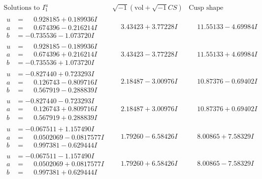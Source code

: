 \documentclass[1p]{elsarticle_modified}
\theoremstyle{definition}
\newcommand{\I}{\sqrt{-1}}
\begin{document}
$$\begin{array}{c|c|c}  
\text{Solutions to }I^u_{1}& \I (\text{vol} + \sqrt{-1}CS) & \text{Cusp shape}\\
 \hline 
\begin{aligned}
u &= \phantom{-}0.928185 + 0.189936 I \\
a &= \phantom{-}0.674396 - 0.216214 I \\
b &= -0.735536 - 1.073720 I\end{aligned}
 & \phantom{-}3.43423 + 3.77228 I & \phantom{-}11.55133 - 4.69984 I \\ \hline\begin{aligned}
u &= \phantom{-}0.928185 - 0.189936 I \\
a &= \phantom{-}0.674396 + 0.216214 I \\
b &= -0.735536 + 1.073720 I\end{aligned}
 & \phantom{-}3.43423 - 3.77228 I & \phantom{-}11.55133 + 4.69984 I \\ \hline\begin{aligned}
u &= -0.827440 + 0.723293 I \\
a &= \phantom{-}0.126743 - 0.809716 I \\
b &= \phantom{-}0.567919 - 0.288839 I\end{aligned}
 & \phantom{-}2.18487 - 3.00976 I & \phantom{-}10.87376 - 0.69402 I \\ \hline\begin{aligned}
u &= -0.827440 - 0.723293 I \\
a &= \phantom{-}0.126743 + 0.809716 I \\
b &= \phantom{-}0.567919 + 0.288839 I\end{aligned}
 & \phantom{-}2.18487 + 3.00976 I & \phantom{-}10.87376 + 0.69402 I \\ \hline\begin{aligned}
u &= -0.067511 + 1.157490 I \\
a &= \phantom{-}0.0502069 - 0.0817577 I \\
b &= \phantom{-}0.997381 - 0.629444 I\end{aligned}
 & \phantom{-}1.79260 - 6.58426 I & \phantom{-}8.00865 + 7.58329 I \\ \hline\begin{aligned}
u &= -0.067511 - 1.157490 I \\
a &= \phantom{-}0.0502069 + 0.0817577 I \\
b &= \phantom{-}0.997381 + 0.629444 I\end{aligned}
 & \phantom{-}1.79260 + 6.58426 I & \phantom{-}8.00865 - 7.58329 I \\ \hline\begin{aligned}

\end{aligned}
\end{array}$$
\end{document}
